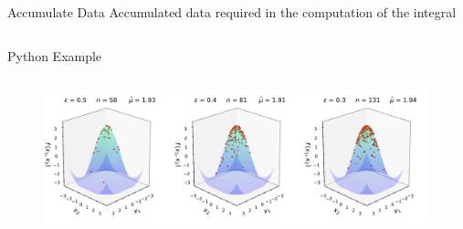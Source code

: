 \documentclass[final]{beamer}
\newlength{\onecolwid}
\newlength{\twocolwid}
\newlength{\threecolwid}
\begin{document}
\begin{frame}[t]
\begin{columns}[t]
\begin{column}{\threecolwid}
\begin{columns}[t,totalwidth=\threecolwid]
\begin{column}{\onecolwid}
\begin{alertblock}{Accumulate Data}
    Accumulated data required in the computation of the integral
\end{alertblock}
\end{column}
\end{columns}

\begin{column}{\threecolwid}\vspace{-.8in}
\begin{block}{Python Example}
    \begin{column}{\onecolwid}
        
    \end{column}
    \begin{column}{\twocolwid}
        \begin{figure}
            \includegraphics[width=0.99\textwidth]{Images/Three_3d_SurfaceScatters.png}
        \end{figure}
    \end{column}
\end{block}
\end{column}
\end{column}


\end{columns}
\end{frame}
\end{document}
